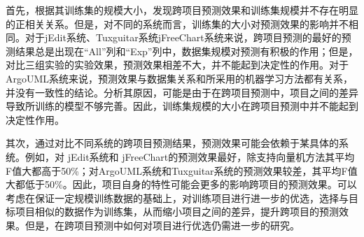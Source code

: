 首先，根据其训练集的规模大小，发现跨项目预测效果和训练集规模并不存在明显的正相关关系。但是，对不同的系统而言，训练集的大小对预测效果的影响并不相同。对于jEdit系统、Tuxguitar系统jFreeChart系统来说，跨项目预测的最好的预测结果总是出现在“All”列和“Exp”列中，数据集规模对预测有积极的作用；但是，对比三组实验的实验效果，预测效果相差不大，并不能起到决定性的作用。对于ArgoUML系统来说，预测效果与数据集关系和所采用的机器学习方法都有关系，并没有一致性的结论。分析其原因，可能是由于在跨项目预测中，项目之间的差异导致所训练的模型不够完善。因此，训练集规模的大小在跨项目预测中并不能起到决定性作用。

其次，通过对比不同系统的跨项目预测结果，预测效果可能会依赖于某具体的系统。例如，对 jEdit系统和 jFreeChart的预测效果最好，除支持向量机方法其平均F值大都高于50\%；对ArgoUML系统和Tuxguitar系统的预测效果较差，其平均F值大都低于50\%。因此，项目自身的特性可能会更多的影响跨项目的预测效果。可以考虑在保证一定规模训练数据的基础上，对训练项目进行进一步的优选，选择与目标项目相似的数据作为训练集，从而缩小项目之间的差异，提升跨项目的预测效果。但是，在跨项目预测中如何对项目进行优选仍需进一步的研究。

